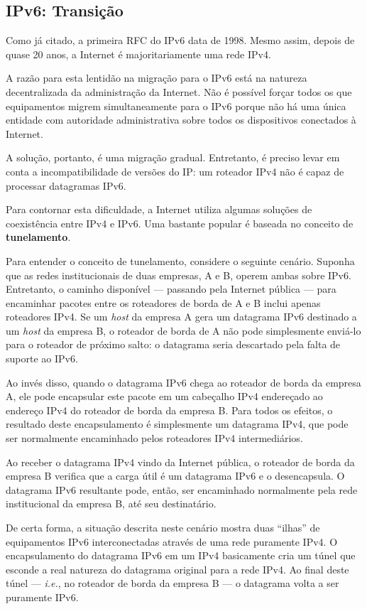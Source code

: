 \documentclass{article}
\begin{document}
\subsection{IPv6: Transição}

Como já citado, a primeira RFC do IPv6 data de 1998. Mesmo assim, depois de quase 20 anos, a Internet é majoritariamente uma rede IPv4.

A razão para esta lentidão na migração para o IPv6 está na natureza decentralizada da administração da Internet. Não é possível forçar todos os que equipamentos migrem simultaneamente para o IPv6 porque não há uma única entidade com autoridade administrativa sobre todos os dispositivos conectados à Internet.

A solução, portanto, é uma migração gradual. Entretanto, é preciso levar em conta a incompatibilidade de versões do IP: um roteador IPv4 não é capaz de processar datagramas IPv6.

Para contornar esta dificuldade, a Internet utiliza algumas soluções de coexistência entre IPv4 e IPv6. Uma bastante popular é baseada no conceito de \textbf{tunelamento}.

Para entender o conceito de tunelamento, considere o seguinte cenário. Suponha que as redes institucionais de duas empresas, A e B, operem ambas sobre IPv6. Entretanto, o caminho disponível --- passando pela Internet pública --- para encaminhar pacotes entre os roteadores de borda de A e B inclui apenas roteadores IPv4. Se um \textit{host} da empresa A gera um datagrama IPv6 destinado a um \textit{host} da empresa B, o roteador de borda de A não pode simplesmente enviá-lo para o roteador de próximo salto: o datagrama seria descartado pela falta de suporte ao IPv6.

Ao invés disso, quando o datagrama IPv6 chega ao roteador de borda da empresa A, ele pode encapsular este pacote em um cabeçalho IPv4 endereçado ao endereço IPv4 do roteador de borda da empresa B. Para todos os efeitos, o resultado deste encapsulamento é simplesmente um datagrama IPv4, que pode ser normalmente encaminhado pelos roteadores IPv4 intermediários. 

Ao receber o datagrama IPv4 vindo da Internet pública, o roteador de borda da empresa B verifica que a carga útil é um datagrama IPv6 e o desencapsula. O datagrama IPv6 resultante pode, então, ser encaminhado normalmente pela rede institucional da empresa B, até seu destinatário.

De certa forma, a situação descrita neste cenário mostra duas ``ilhas'' de equipamentos IPv6 interconectadas através de uma rede puramente IPv4. O encapsulamento do datagrama IPv6 em um IPv4 basicamente cria um túnel que esconde a real natureza do datagrama original para a rede IPv4. Ao final deste túnel --- \textit{i.e.}, no roteador de borda da empresa B --- o datagrama volta a ser puramente IPv6.
\end{document}
